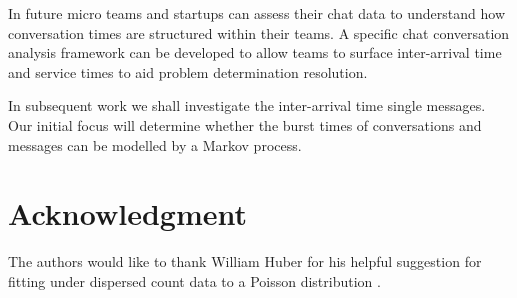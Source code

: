 \documentclass[conference]{IEEEtran}
\begin{document}
In future micro teams and startups can assess their chat data to understand how conversation times are structured within their teams. A specific chat conversation analysis framework can be developed to allow teams to surface inter-arrival time and service times to aid problem determination resolution. 

In subsequent work we shall investigate the inter-arrival time single messages. Our initial focus will determine whether the burst times of conversations and messages can be modelled by a Markov process.


\section*{Acknowledgment}
The authors would like to thank William Huber for his helpful suggestion for fitting under dispersed count data to a Poisson distribution \cite{poissoncount}.



\end{document}
